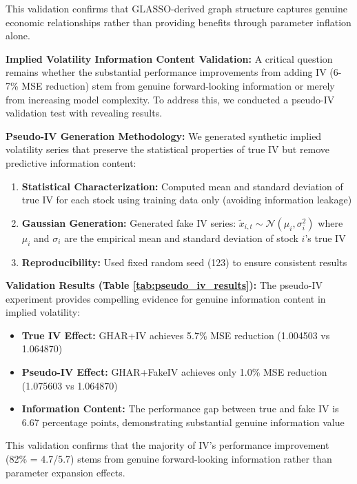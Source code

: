 \documentclass[12pt,a4paper]{article}
\begin{document}
This validation confirms that GLASSO-derived graph structure captures genuine economic relationships rather than providing benefits through parameter inflation alone.

\textbf{Implied Volatility Information Content Validation:} A critical question remains whether the substantial performance improvements from adding IV (6-7\% MSE reduction) stem from genuine forward-looking information or merely from increasing model complexity. To address this, we conducted a pseudo-IV validation test with revealing results.

\textbf{Pseudo-IV Generation Methodology:} We generated synthetic implied volatility series that preserve the statistical properties of true IV but remove predictive information content:

\begin{enumerate}
\item \textbf{Statistical Characterization:} Computed mean and standard deviation of true IV for each stock using training data only (avoiding information leakage)
\item \textbf{Gaussian Generation:} Generated fake IV series: $\tilde{x}_{i,t} \sim \mathcal{N}(\mu_i, \sigma_i^2)$ where $\mu_i$ and $\sigma_i$ are the empirical mean and standard deviation of stock $i$'s true IV
\item \textbf{Reproducibility:} Used fixed random seed (123) to ensure consistent results
\end{enumerate}

\textbf{Validation Results (Table \ref{tab:pseudo_iv_results}):} The pseudo-IV experiment provides compelling evidence for genuine information content in implied volatility:

\begin{itemize}
\item \textbf{True IV Effect:} GHAR+IV achieves 5.7\% MSE reduction (1.004503 vs 1.064870)
\item \textbf{Pseudo-IV Effect:} GHAR+FakeIV achieves only 1.0\% MSE reduction (1.075603 vs 1.064870)
\item \textbf{Information Content:} The performance gap between true and fake IV is 6.67 percentage points, demonstrating substantial genuine information value
\end{itemize}

This validation confirms that the majority of IV's performance improvement (82\% = 4.7/5.7) stems from genuine forward-looking information rather than parameter expansion effects.
\end{document}
